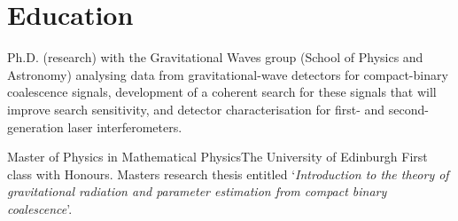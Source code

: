 \section{Education}
%
    {Ph.D. (research) with the Gravitational Waves group (School of Physics %
     and Astronomy) analysing data from gravitational-wave detectors for %
     compact-binary coalescence signals, development of a coherent search for %
     these signals that will improve search sensitivity, and detector %
     characterisation for first- and second-generation laser interferometers.}

%
    {Master of Physics in Mathematical Physics}{The University of Edinburgh}{}{}
    {First class with Honours. Masters research thesis entitled %
     `\textit{Introduction to the theory of gravitational radiation and %
              parameter estimation from compact binary coalescence}'.}
